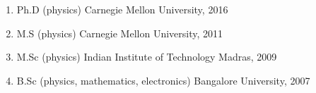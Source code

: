 \begin{enumerate}
    \item Ph.D (physics) \hfill Carnegie Mellon University, 2016
    \item M.S (physics) \hfill Carnegie Mellon University, 2011
    \item M.Sc (physics) \hfill Indian Institute of Technology Madras, 2009
    \item B.Sc (physics, mathematics, electronics) \hfill Bangalore University, 2007
\end{enumerate}